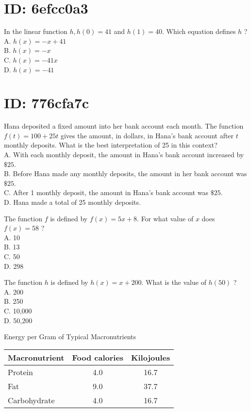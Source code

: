 \section*{ID: 6efcc0a3}
In the linear function $h, h(0)=41$ and $h(1)=40$. Which equation defines $h$ ?\\
A. $h(x)=-x+41$\\
B. $h(x)=-x$\\
C. $h(x)=-41 x$\\
D. $h(x)=-41$

\section*{ID: 776cfa7c}
Hana deposited a fixed amount into her bank account each month. The function $f(t)=100+25 t$ gives the amount, in dollars, in Hana's bank account after $t$ monthly deposits. What is the best interpretation of 25 in this context?\\
A. With each monthly deposit, the amount in Hana's bank account increased by $\$ 25$.\\
B. Before Hana made any monthly deposits, the amount in her bank account was $\$ 25$.\\
C. After 1 monthly deposit, the amount in Hana's bank account was $\$ 25$.\\
D. Hana made a total of 25 monthly deposits.

The function $f$ is defined by $f(x)=5 x+8$. For what value of $x$ does $f(x)=58$ ?\\
A. 10\\
B. 13\\
C. 50\\
D. 298

The function $h$ is defined by $h(x)=x+200$. What is the value of $h(50)$ ?\\
A. 200\\
B. 250\\
C. 10,000\\
D. 50,200

Energy per Gram of Typical Macronutrients

\begin{center}
\begin{tabular}{|l|c|c|}
\hline
Macronutrient & Food calories & Kilojoules \\
\hline
Protein & 4.0 & 16.7 \\
\hline
Fat & 9.0 & 37.7 \\
\hline
Carbohydrate & 4.0 & 16.7 \\
\hline
\end{tabular}
\end{center}

